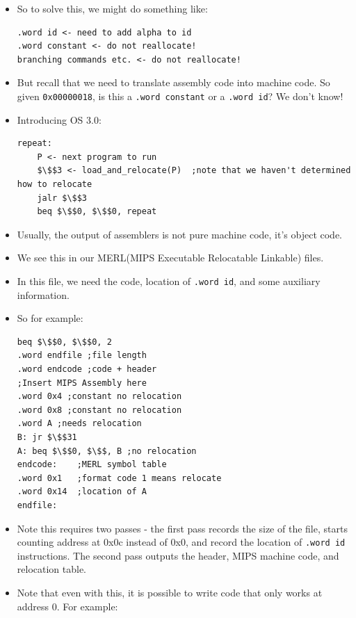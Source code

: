 \documentclass[12pt]{article}
\begin{document}
\begin{itemize}
    \item So to solve this, we might do something like:
\begin{lstlisting}[mathescape, numbers=none, breaklines=true]
.word id <- need to add alpha to id
.word constant <- do not reallocate!
branching commands etc. <- do not reallocate!
\end{lstlisting}
    \item But recall that we need to translate assembly code into machine code.  So given \lstinline[mathescape]{0x00000018}, is this a \lstinline[mathescape]{.word constant} or a \lstinline[mathescape]{.word id}?  We don't know!
    \item Introducing OS 3.0:
\begin{lstlisting}[mathescape, numbers=none, breaklines=true]
repeat:
    P <- next program to run
    $\$$3 <- load_and_relocate(P)  ;note that we haven't determined how to relocate
    jalr $\$$3
    beq $\$$0, $\$$0, repeat
\end{lstlisting}
    \item Usually, the output of assemblers is not pure machine code, it's object code.
    \item We see this in our MERL(MIPS Executable Relocatable Linkable) files.
    \item In this file, we need the code, location of \lstinline[mathescape]{.word id}, and some auxiliary information.
    \item So for example:
\begin{lstlisting}[mathescape, numbers=none, breaklines=true]
beq $\$$0, $\$$0, 2
.word endfile ;file length
.word endcode ;code + header
;Insert MIPS Assembly here
.word 0x4 ;constant no relocation
.word 0x8 ;constant no relocation
.word A ;needs relocation
B: jr $\$$31
A: beq $\$$0, $\$$, B ;no relocation
endcode:    ;MERL symbol table
.word 0x1   ;format code 1 means relocate
.word 0x14  ;location of A
endfile:
\end{lstlisting}
    \item Note this requires two passes - the first pass records the size of the file, starts counting address at 0x0c instead of 0x0, and record the location of \lstinline[mathescape]{.word id} instructions.  The second pass outputs the header, MIPS machine code, and relocation table.
    \item Note that even with this, it is possible to write code that only works at address 0.  For example:
\begin{lstlisting}[mathescape, numbers=none, breaklines=true]

\end{lstlisting}
\end{itemize}
\end{document}

